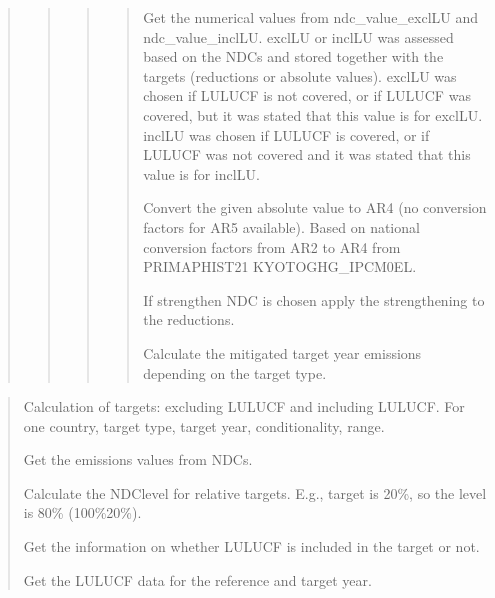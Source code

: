 \documentclass[letterpaper,10pt,english]{sphinxmanual}
\begin{document}
\begin{quote}
\begin{quote}
\begin{quote}
\begin{quote}
Get the numerical values from ndc\_value\_exclLU and ndc\_value\_inclLU.
exclLU or inclLU was assessed based on the NDCs and stored together with the targets
(reductions or absolute values).
exclLU was chosen if LULUCF is not covered, or if LULUCF was covered, but it was stated that this value is for exclLU.
inclLU was chosen if LULUCF is covered, or if LULUCF was not covered and it was stated that this value is for inclLU.

Convert the given absolute value to AR4 (no conversion factors for AR5 available).
Based on national conversion factors from AR2 to AR4 from PRIMAPHIST21 KYOTOGHG\_IPCM0EL.

If strengthen NDC is chosen apply the strengthening to the reductions.

Calculate the mitigated target year emissions depending on the target type.
\end{quote}
\end{quote}
\end{quote}
\end{quote}

\begin{quote}

Calculation of targets: excluding LULUCF and including LULUCF.
For one country, target type, target year, conditionality, range.

Get the emissions values from NDCs.

Calculate the NDC\sphinxhyphen{}level for relative targets. E.g., target is \sphinxhyphen{}20\%, so the level is 80\% (100\%\sphinxhyphen{}20\%).

Get the information on whether LULUCF is included in the target or not.

Get the LULUCF data for the reference and target year.
\end{quote}
\end{document}
